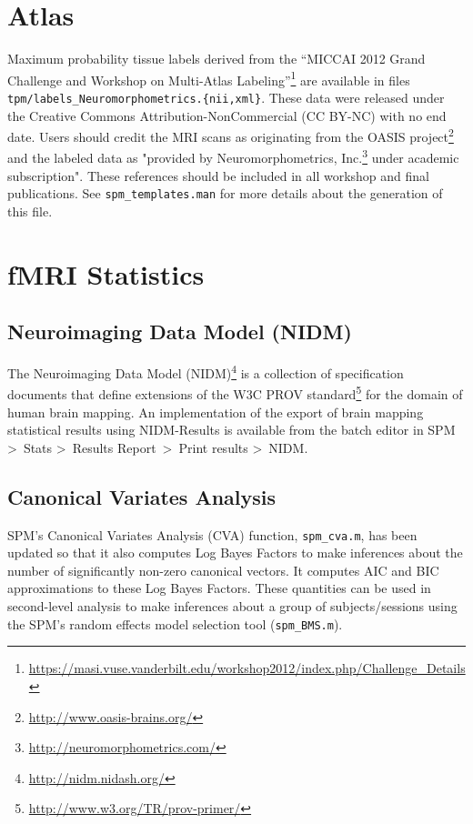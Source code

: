 \documentclass[a4paper,titlepage,openany]{article}
\begin{document}
\section{Atlas}

Maximum probability tissue labels derived from the ``MICCAI 2012 Grand Challenge and Workshop on Multi-Atlas Labeling''\footnote{\url{https://masi.vuse.vanderbilt.edu/workshop2012/index.php/Challenge_Details}} are available in files \texttt{tpm/labels\_Neuromorphometrics.\{nii,xml\}}.
These data were released under the Creative Commons Attribution-NonCommercial (CC BY-NC) with no end date. Users should credit the MRI scans as originating from the OASIS project\footnote{\url{http://www.oasis-brains.org/}} and the labeled data as "provided by Neuromorphometrics, Inc.\footnote{\url{http://neuromorphometrics.com/}} under academic subscription". These references should be included in all workshop and final publications.
See \texttt{spm\_templates.man} for more details about the generation of this file.

\section{fMRI Statistics}

\subsection{Neuroimaging Data Model (NIDM)}

The Neuroimaging Data Model (NIDM)\footnote{\url{http://nidm.nidash.org/}} is a collection of specification documents that define extensions of the W3C PROV standard\footnote{\url{http://www.w3.org/TR/prov-primer/}} for the domain of human brain mapping.
An implementation of the export of brain mapping statistical results using NIDM-Results \cite{Maumet2014} is available from the batch editor in SPM \textgreater\ Stats \textgreater\ Results Report\ \textgreater\ Print results \textgreater\ NIDM.

\subsection{Canonical Variates Analysis}

SPM's Canonical Variates Analysis (CVA) function, \texttt{spm\_cva.m}, has been updated so that it also computes Log Bayes Factors to make inferences about the number of significantly non-zero canonical vectors. It computes AIC and BIC approximations to these Log Bayes Factors. These quantities can be used in second-level analysis to make inferences about a group of subjects/sessions using the SPM's random effects model selection tool (\texttt{spm\_BMS.m}).
\end{document}
